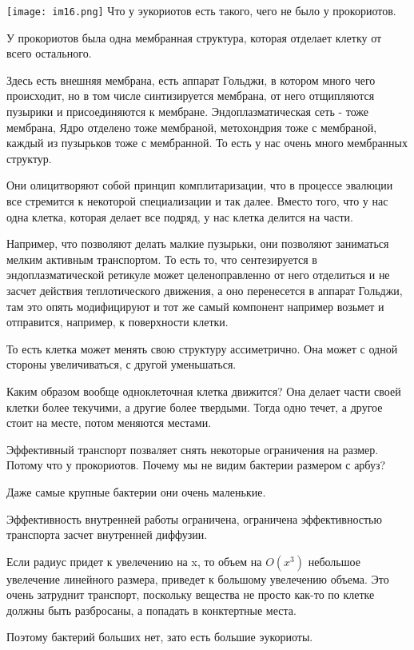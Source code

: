 ﻿\texttt{[image: im16.png]}
Что у эукориотов есть такого, чего не было у прокориотов. 

У прокориотов была одна мембранная структура, которая отделает клетку от 
всего остального. 

Здесь есть внешняя мембрана, есть аппарат Гольджи, в котором много чего происходит, 
но в том числе синтизируется мембрана, от него отщипляются пузырики и присоединяются
к мембране. Эндоплазматическая сеть - тоже мембрана, Ядро отделено тоже мембраной, 
метохондрия тоже с мембраной, каждый из пузырьков тоже с мембранной. То есть 
у нас очень много мембранных структур. 

Они олицитворяют собой принцип комплитаризации, что в процессе эвалюции все 
стремится к некоторой специализации и так далее. Вместо того, 
что у нас одна клетка, которая делает все подряд, у нас клетка делится 
на части. 

Например, что позволяют делать малкие пузырьки, они позволяют
заниматься мелким активным транспортом. То есть то, 
что сентезируется в эндоплазматической ретикуле может 
целеноправленно от него отделиться и не 
засчет действия теплотического движения, а оно перенесется 
в аппарат Гольджи, там это опять модифицируют и тот же самый 
компонент например возьмет и отправится, например, к поверхности клетки. 

То есть клетка может менять свою структуру ассиметрично. Она может 
с одной стороны увеличиваться, с другой уменьшаться. 

Каким образом вообще одноклеточная клетка движится? 
Она делает части своей клетки более текучими, а
другие более твердыми. Тогда одно течет, а
другое стоит на месте, потом меняются местами. 

Эффективный транспорт позваляет снять некоторые ограничения на размер. 
Потому что у прокориотов. Почему мы не видим бактерии размером с арбуз? 

Даже самые крупные бактерии они очень маленькие. 

Эффективность внутренней работы ограничена, ограничена эффективностью 
транспорта засчет внутренней диффузии. 

Если радиус придет к увелечению на x, то объем на $O(x^3)$ небольшое 
увелечение линейного размера, 
приведет к большому увелечению объема. Это очень затруднит 
транспорт, поскольку вещества не просто как-то 
по клетке должны быть разбросаны, а попадать 
в конктертные места. 

Поэтому бактерий больших нет, зато есть большие эукориоты. 

